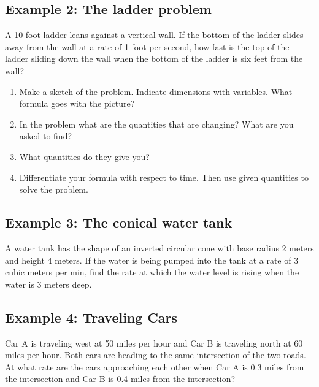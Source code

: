 \documentclass[10pt]{book}
\theoremstyle{definition}
\begin{document}
\subsection*{Example 2: The ladder problem}
A 10 foot ladder leans against a vertical wall. If the bottom of the ladder slides away from the wall at a rate of 1 foot per second, how fast is the top of the ladder sliding down the wall when the bottom of the ladder is six feet from the wall?
\begin{enumerate}[label=(\alph*)]
    \item Make a sketch of the problem. Indicate dimensions with variables. What formula goes with the picture?\vspace{4cm} 
    \item In the problem what are the quantities that are changing? What are you asked to find?\vspace{2cm}
    \item What quantities do they give you?\vspace{2cm}
    \item Differentiate your formula with respect to time. Then use given quantities to solve the problem.
\end{enumerate}
\clearpage
\subsection*{Example 3: The conical water tank} A water tank has the shape of an inverted circular cone with base radius 2 meters and height 4 meters. If the water is being pumped into the tank at a rate of 3 cubic meters per min, find the rate at which the water level is rising when the water is 3 meters deep.
\clearpage
\subsection*{Example 4: Traveling Cars} Car A is traveling west at 50 miles per hour and Car B is traveling north at 60 miles per hour. Both cars are heading to the same intersection of the two roads. At what rate are the cars approaching each other when Car A is 0.3 miles from the intersection and Car B is 0.4 miles from the intersection?
\end{document}
